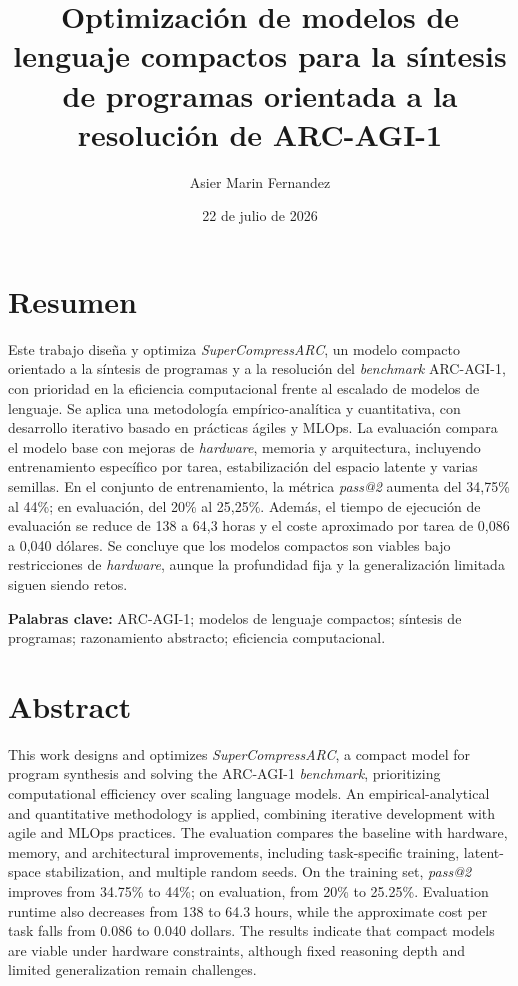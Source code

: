 \documentclass[11pt,a4paper,spanish]{book}
\title{Optimización de modelos de lenguaje compactos para la síntesis de programas orientada a la resolución de ARC-AGI-1}
\author{Asier Marin Fernandez}
\date{22 de julio de 2026}
\numberwithin{equation}{chapter}
\numberwithin{figure}{chapter}
\begin{document}
\renewcommand{\listfigurename}{Índice de Ilustraciones}
\renewcommand{\listtablename}{Índice de Tablas}
\renewcommand{\contentsname}{Índice de Contenidos}
\renewcommand{\figurename}{Figura}
\renewcommand{\tablename}{Tabla} 

\frontmatter
\maketitle
\tableofcontents
\listoffigures
\listoftables

\chapter{Resumen}
Este trabajo diseña y optimiza \textit{SuperCompressARC}, un modelo compacto orientado a la síntesis de programas y a la resolución del \textit{benchmark} ARC-AGI-1, con prioridad en la eficiencia computacional frente al escalado de modelos de lenguaje. Se aplica una metodología empírico-analítica y cuantitativa, con desarrollo iterativo basado en prácticas ágiles y MLOps. La evaluación compara el modelo base con mejoras de \textit{hardware}, memoria y arquitectura, incluyendo entrenamiento específico por tarea, estabilización del espacio latente y varias semillas. En el conjunto de entrenamiento, la métrica \textit{pass@2} aumenta del 34,75\% al 44\%; en evaluación, del 20\% al 25,25\%. Además, el tiempo de ejecución de evaluación se reduce de 138 a 64,3 horas y el coste aproximado por tarea de 0,086 a 0,040 dólares. Se concluye que los modelos compactos son viables bajo restricciones de \textit{hardware}, aunque la profundidad fija y la generalización limitada siguen siendo retos.

{\bf Palabras clave:} ARC-AGI-1; modelos de lenguaje compactos; síntesis de programas; razonamiento abstracto; eficiencia computacional.

\chapter{Abstract}
This work designs and optimizes \textit{SuperCompressARC}, a compact model for program synthesis and solving the ARC-AGI-1 \textit{benchmark}, prioritizing computational efficiency over scaling language models. An empirical-analytical and quantitative methodology is applied, combining iterative development with agile and MLOps practices. The evaluation compares the baseline with hardware, memory, and architectural improvements, including task-specific training, latent-space stabilization, and multiple random seeds. On the training set, \textit{pass@2} improves from 34.75\% to 44\%; on evaluation, from 20\% to 25.25\%. Evaluation runtime also decreases from 138 to 64.3 hours, while the approximate cost per task falls from 0.086 to 0.040 dollars. The results indicate that compact models are viable under hardware constraints, although fixed reasoning depth and limited generalization remain challenges.
\end{document}
